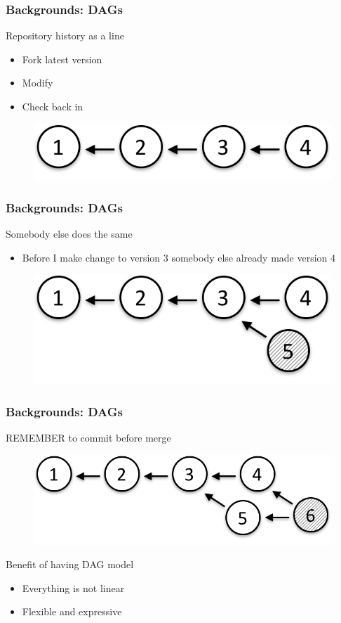 \documentclass[newPxFont,sthlmFooter,nooffset]{beamer}
\begin{document}
\begin{frame}[t]
  \frametitle{Backgrounds: DAGs}
Repository history as a line
\begin{itemize}
\item Fork latest version
\item Modify
\item Check back in
\end{itemize}
\begin{figure}[h]
  \centering
  \includegraphics[width=0.5\linewidth]{figures/fig1}
\end{figure}


\end{frame}

\begin{frame}[t]
  \frametitle{Backgrounds: DAGs}
Somebody else does the same
\begin{itemize}
\item Before I make change to version 3 somebody else already made
  version 4
\end{itemize}


\begin{figure}[h]
  \centering
  \includegraphics[width=0.5\linewidth]{figures/fig2}
\end{figure}


\end{frame}

\begin{frame}[t]
  \frametitle{Backgrounds: DAGs}
REMEMBER to commit before merge
\begin{figure}[h]
  \centering
  \includegraphics[width=0.5\linewidth]{figures/fig3}
\end{figure}

Benefit of having DAG model
\begin{itemize}
\item Everything is not linear
\item Flexible and expressive
\end{itemize}


\end{frame}
\end{document}
